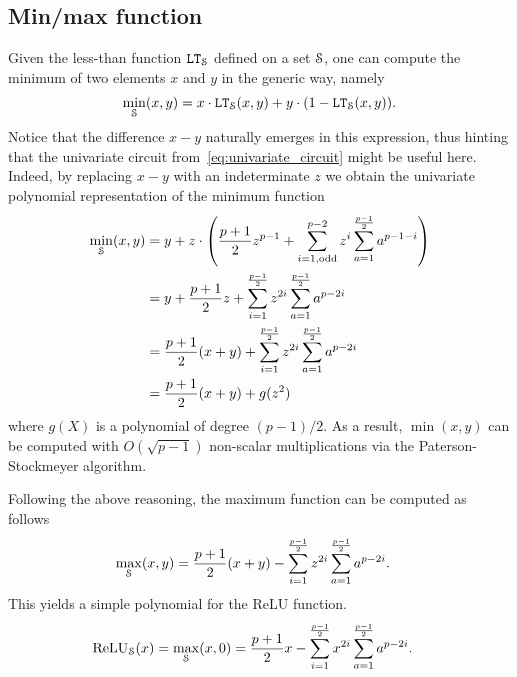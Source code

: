 \subsection{Min/max function}

  Given the less-than function $\LT_\S$ defined on a set $\S$, one can compute the minimum of two elements $x$ and $y$ in the generic way, namely
  \begin{align*}
    \min_\S(x,y) = x \cdot \LT_\S(x,y) + y \cdot (1 - \LT_\S(x,y)).
  \end{align*}
  Notice that the difference $x - y$ naturally emerges in this expression, thus hinting that the univariate circuit from~\ref{eq:univariate_circuit} might be useful here.
  Indeed, by replacing $x - y$ with an indeterminate $z$ we obtain the univariate polynomial representation of the minimum function 
  \begin{align*}
    \min_\S(x,y) & = y + z \cdot \left(\frac{p+1}{2} z^{p-1} + \sum_{i=1, \text{odd}}^{p-2} z^i \sum_{a=1}^{\frac{p-1}{2}} a^{p-1-i}\right) \\
    & = y + \frac{p+1}{2} z + \sum_{i=1}^{\frac{p-1}{2}} z^{2i} \sum_{a=1}^{\frac{p-1}{2}} a^{p-2i} \\
    & = \frac{p+1}{2} (x+y) + \sum_{i=1}^{\frac{p-1}{2}} z^{2i} \sum_{a=1}^{\frac{p-1}{2}} a^{p-2i} \\
    & = \frac{p+1}{2} (x+y) + g(z^2)
  \end{align*}
  where $g(X)$ is a polynomial of degree $(p-1)/2$. 
  As a result, $\min(x,y)$ can be computed with $O(\sqrt{p-1})$ non-scalar multiplications via the Paterson-Stockmeyer algorithm.

  Following the above reasoning, the maximum function can be computed as follows
  \begin{align*}
    \max_\S(x,y) &= \frac{p+1}{2} (x+y) - \sum_{i=1}^{\frac{p-1}{2}} z^{2i} \sum_{a=1}^{\frac{p-1}{2}} a^{p-2i}.
  \end{align*}
  This yields a simple polynomial for the ReLU function.
  \begin{align*}
    \ReLU_\S(x) = \max_\S(x,0) &= \frac{p+1}{2} x - \sum_{i=1}^{\frac{p-1}{2}} x^{2i} \sum_{a=1}^{\frac{p-1}{2}} a^{p-2i}.
  \end{align*}

